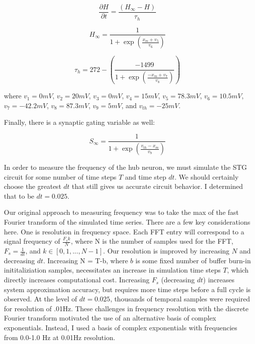 \documentclass[11pt]{article}
\begin{document}
\begin{equation}  \frac{\partial H}{\partial t} = \frac{\left( H_\infty - H \right)}{\tau_h} 
\end{equation}

\begin{equation}  H_\infty = \frac{1}{1 + \exp \left( \frac{x_m + v_5}{v_6} \right)} 
\end{equation}

\begin{equation}  \tau_h = 272 - \left( \frac{-1499}{1 + \exp \left( \frac{-x_m + v_7}{v_8} \right)} \right) 
\end{equation}

where $v_1 = 0mV$, $v_2  = 20mV$, $v_3 = 0mV$, $v_4 = 15mV$, $v_5 = 78.3mV$,
$v_6 = 10.5mV$, $v_7 = -42.2mV$, $v_8 = 87.3mV$, $v_9 = 5mV$, and $v_{th} = -25mV$.

Finally, there is a synaptic gating variable as well:

\begin{equation} S_\infty = \frac{1}{1 + \exp \left( \frac{v_{th} - x_m}{v_9} \right)}
\end{equation}

In order to measure the frequency of the hub neuron, we must simulate the STG circuit for some number of time steps $T$ and time step $dt$.  We should certainly choose the greatest $dt$ that still gives us accurate circuit behavior.  I determined that to be $dt = 0.025$.  

Our original approach to measuring frequency was to take the max of the fast Fourier transform of the simulated time series.  There are a few key considerations here.  One is resolution in frequency space.  Each FFT entry will correspond to a signal frequency of $\frac{F_s k}{N}$, where N is the number of samples used for the FFT, $F_s = \frac{1}{dt}$, and $k \in \left[0, 1, ..., N-1\right]$.  Our resolution is improved by increasing $N$ and decreasing $dt$.  Increasing N = T-b, where $b$ is some fixed number of buffer burn-in inititaliziation samples, necessitates an increase in simulation time steps $T$, which directly increases computational cost.  Increasing $F_s$ (decreasing $dt$) increases system approximation accuracy, but requires more time steps before a full cycle is observed.  At the level of $dt = 0.025$, thousands of temporal samples were required for resolution of .01Hz.  These challenges in frequency resolution with the discrete Fourier transform motivated the use of an alternative basis of complex exponentials.  Instead, I used a basis of complex exponentials with frequencies from 0.0-1.0 Hz at 0.01Hz resolution.  
\end{document}
